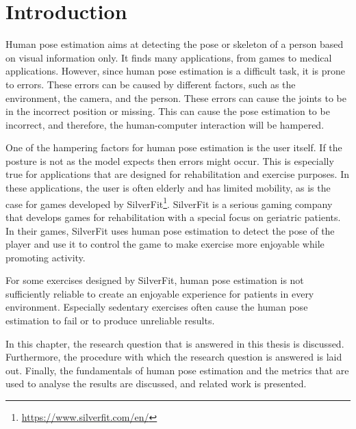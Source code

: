\chapter{Introduction}
\setcounter{page}{1}

Human pose estimation aims at detecting the pose or skeleton of a person based on visual information only. It finds many applications, from games to medical applications\cite{kumarapu2020animepose, ClinicalApplicationChen, MedicalAnimation}. However, since human pose estimation is a difficult task, it is prone to errors\cite{HPEIsHard}. These errors can be caused by different factors, such as the environment, the camera, and the person. These errors can cause the joints to be in the incorrect position or missing. This can cause the pose estimation to be incorrect, and therefore, the human-computer interaction will be hampered.

One of the hampering factors for human pose estimation is the user itself. If the posture is not as the model expects then errors might occur. This is especially true for applications that are designed for rehabilitation and exercise purposes. In these applications, the user is often elderly and has limited mobility, as is the case for games developed by SilverFit\footnote{\url{https://www.silverfit.com/en/}}. SilverFit is a serious gaming company that develops games for rehabilitation with a special focus on geriatric patients. In their games, SilverFit uses human pose estimation to detect the pose of the player and use it to control the game to make exercise more enjoyable while promoting activity.

For some exercises designed by SilverFit, human pose estimation is not sufficiently reliable to create an enjoyable experience for patients in every environment. Especially sedentary exercises often cause the human pose estimation to fail or to produce unreliable results.

In this chapter, the research question that is answered in this thesis is discussed. Furthermore, the procedure with which the research question is answered is laid out. Finally, the fundamentals of human pose estimation and the metrics that are used to analyse the results are discussed, and related work is presented.




